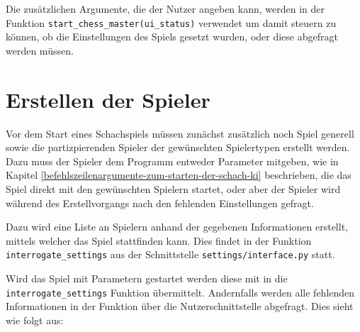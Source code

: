     Die zusätzlichen Argumente, die der Nutzer angeben kann, werden in der
Funktion \texttt{start\_chess\_master(ui\_status)} verwendet um damit
steuern zu können, ob die Einstellungen des Spiels gesetzt wurden, oder
diese abgefragt werden müssen.

    \section{Erstellen der Spieler}\label{erstellen-der-spieler}

Vor dem Start eines Schachspiels müssen zunächst zusätzlich noch Spiel
generell sowie die partizpierenden Spieler der gewünschten Spielertypen
erstellt werden. Dazu muss der Spieler dem Programm entweder Parameter
mitgeben, wie in Kapitel \ref{befehlszeilenargumente-zum-starten-der-schach-ki} beschrieben, die das Spiel direkt mit
den gewünschten Spielern startet, oder aber der Spieler wird während des
Erstellvorgangs nach den fehlenden Einstellungen gefragt.

Dazu wird eine Liste an Spielern anhand der gegebenen Informationen
erstellt, mittels welcher das Spiel stattfinden kann. Dies findet
in der Funktion \texttt{interrogate\_settings} aus der Schnittstelle
\texttt{settings/interface.py} statt.

Wird das Spiel mit Parametern gestartet werden diese mit in die
\texttt{interrogate\_settings} Funktion übermittelt. Andernfalls werden
alle fehlenden Informationen in der Funktion über die
Nutzerschnittstelle abgefragt. Dies sieht wie folgt aus:

